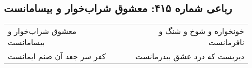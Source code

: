 \begin{center}
\section*{رباعی شماره ۴۱۵: معشوق شراب‌خوار و بیسامانست}
\label{sec:0415}
\begin{longtable}{l p{0.5cm} r}
معشوق شراب‌خوار و بیسامانست
&&
خونخواره و شوخ و شنگ و نافرمانست
\\
کفر سر جعد آن صنم ایمانست
&&
دیریست که درد عشق بیدرمانست
\\
\end{longtable}
\end{center}
